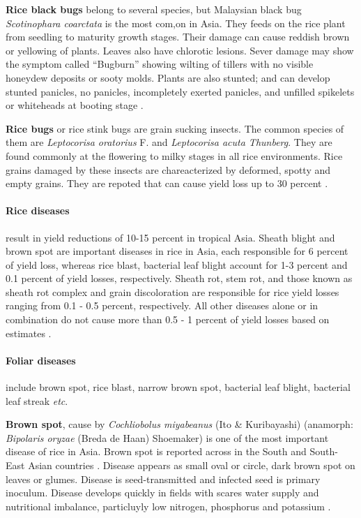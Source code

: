 \documentclass[12pt, oneside]{report}
\begin{document}
\textbf{Rice black bugs} belong to several species, but Malaysian black bug \textit{Scotinophara coarctata} is the most com,on in Asia. They feeds on the rice plant from seedling to maturity growth stages. Their damage can cause reddish brown or yellowing of plants. Leaves also have chlorotic lesions. Sever damage may show the symptom called ``Bugburn'' showing wilting of tillers with no visible honeydew deposits or sooty molds. Plants are also stunted; and can develop stunted panicles, no panicles, incompletely exerted panicles, and unfilled spikelets or whiteheads at booting stage \citep{irrirkb}.

\textbf{Rice bugs} or rice stink bugs are grain sucking insects. The common species of them are \textit{Leptocorisa oratorius} F. and \textit{Leptocorisa acuta Thunberg}. They are found commonly at the flowering to milky stages in all rice environments. Rice grains damaged by these insects are chareacterized by deformed, spotty and empty grains. They are repoted that can cause yield loss up to 30 percent \citet{irrirkb}.

\paragraph{Rice diseases} result in yield reductions of 10-15 percent in tropical Asia. Sheath blight and brown spot are important diseases in rice in Asia, each responsible for 6 percent of yield loss, whereas rice blast, bacterial leaf blight account for 1-3 percent and 0.1 percent of yield losses, respectively. Sheath rot, stem rot, and those known as sheath rot complex and grain discoloration are responsible for rice yield losses ranging from 0.1 - 0.5 percent, respectively. All other diseases alone or in combination do not cause more than 0.5 - 1 percent of yield losses based on estimates \citep{Savary:2000vr, mew2002handbook}.

\paragraph{Foliar diseases} include brown spot, rice blast, narrow brown spot, bacterial leaf blight, bacterial leaf streak \textit{etc}.

\textbf{Brown spot}, cause by \textit{Cochliobolus miyabeanus} (Ito \& Kuribayashi) (anamorph: \textit{Bipolaris oryzae} (Breda de Haan) Shoemaker) is one of the most important disease of rice in Asia. Brown spot is reported across in the South and South-East Asian countries \citep{barnwal2013review}. Disease appears as small oval or circle, dark brown spot on leaves or glumes. Disease is seed-transmitted and infected seed is primary inoculum. Disease develops quickly in fields with scares water supply and nutritional imbalance, particluyly low nitrogen, phosphorus and potassium \citep{irrirkb}. 
\end{document}
